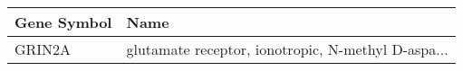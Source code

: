 \begin{tabular}{ll}
\toprule
Gene Symbol &                                               Name \\
\midrule
     GRIN2A & glutamate receptor, ionotropic, N-methyl D-aspa... \\
\bottomrule
\end{tabular}
